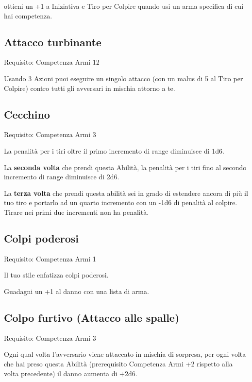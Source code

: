 \documentclass[a4paper,11pt,twoside,openany]{book}
\begin{document}
ottieni un +1 a Iniziativa e Tiro per Colpire quando usi un arma specifica di cui hai competenza.

\subsection{Attacco turbinante}

Requisito: Competenza Armi 12

Usando 3 Azioni puoi eseguire un singolo attacco (con un malus di 5 al Tiro per Colpire) contro tutti gli avversari in mischia attorno a te.

\subsection{Cecchino}

Requisito: Competenza Armi 3

La penalità per i tiri oltre il primo incremento di range diminuisce di 1d6.

La \textbf{seconda volta} che prendi questa Abilità, la penalità per i tiri fino al secondo incremento di range diminuisce di 2d6.

La \textbf{terza volta} che prendi questa abilità sei in grado di estendere ancora di più il tuo tiro e portarlo ad un quarto incremento con un -1d6 di penalità al colpire. Tirare nei primi due incrementi non ha penalità.

\subsection{Colpi poderosi}

Requisito: Competenza Armi 1

Il tuo stile enfatizza colpi poderosi.

Guadagni un +1 al danno con una lista di arma.

\subsection{Colpo furtivo (Attacco alle spalle)}

Requisito: Competenza Armi 3

Ogni qual volta l'avversario viene attaccato in mischia di sorpresa, per ogni volta che hai preso questa Abilità (prerequisito Competenza Armi +2 rispetto alla volta precedente) il danno aumenta di +2d6.
\end{document}
